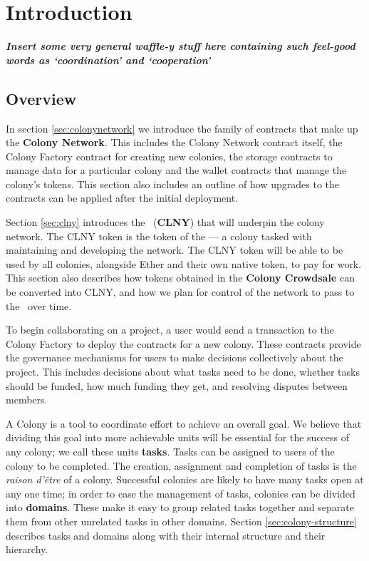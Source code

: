 \section{Introduction}


\textbf{\emph{Insert some very general waffle-y stuff here containing such feel-good words as `coordination' and `cooperation'}}

\subsection{Overview}

In section \ref{sec:colonynetwork} we introduce the family of contracts that make up the \textbf{Colony Network}. This includes the Colony Network contract itself, the Colony Factory contract for creating new colonies, the storage contracts to manage data for a particular colony and the wallet contracts that manage the colony's tokens. This section also includes an outline of how upgrades to the contracts can be applied after the initial deployment.

Section \ref{sec:clny} introduces the \rcts\ (\textbf{CLNY}) that will underpin the colony network. The CLNY token is the token of the \textbf{\rc} --- a colony tasked with maintaining and developing the network. The CLNY token will be able to be used by all colonies, alongside Ether and their own native token, to pay for work. This section also describes how tokens obtained in the \textbf{Colony Crowdsale} can be converted into CLNY, and how we plan for control of the network to pass to the \rc\ over time.

To begin collaborating on a project, a user would send a transaction to the Colony Factory to deploy the contracts for a new colony. These contracts provide the governance mechanisms for users to make decisions collectively about the project. This includes decisions about what tasks need to be done, whether tasks should be funded, how much funding they get, and resolving disputes between members.

A Colony is a tool to coordinate effort to achieve an overall goal. We believe that dividing this goal into more achievable units will be essential for the success of any colony; we call these units \textbf{tasks}. Tasks can be assigned to users of the colony to be completed. The creation, assignment and completion of tasks is the \emph{raison d'être} of a colony. Successful colonies are likely to have many tasks open at any one time; in order to ease the management of tasks, colonies can be divided into \textbf{domains}. These make it easy to group related tasks together and separate them from other unrelated tasks in other domains. Section \ref{sec:colony-structure} describes tasks and domains along with their internal structure and their hierarchy.

